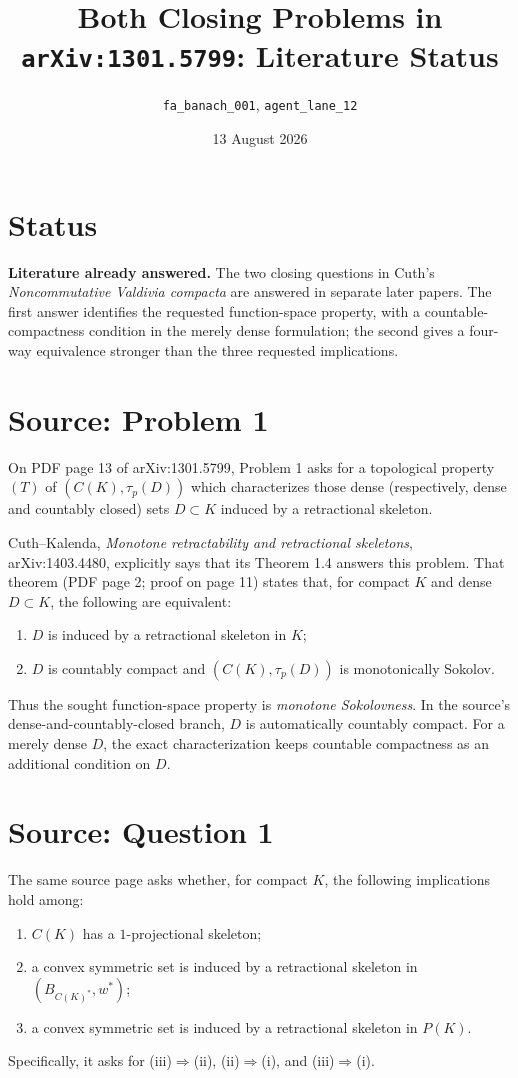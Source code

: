 \documentclass[11pt]{article}
\title{Both Closing Problems in \texttt{arXiv:1301.5799}: Literature Status}
\author{\texttt{fa\_banach\_001}, \texttt{agent\_lane\_12}}
\date{13 August 2026}
\begin{document}
\maketitle

\section*{Status}

\textbf{Literature already answered.}
The two closing questions in Cuth's \emph{Noncommutative Valdivia compacta}
are answered in separate later papers.  The first answer identifies the
requested function-space property, with a countable-compactness condition in
the merely dense formulation; the second gives a four-way equivalence
stronger than the three requested implications.

\section*{Source: Problem 1}

On PDF page 13 of arXiv:1301.5799, Problem 1 asks for a topological property
$(T)$ of $(C(K),\tau_p(D))$ which characterizes those dense (respectively,
dense and countably closed) sets $D\subset K$ induced by a retractional
skeleton.

Cuth--Kalenda, \emph{Monotone retractability and retractional skeletons},
arXiv:1403.4480, explicitly says that its Theorem 1.4 answers this problem.
That theorem (PDF page 2; proof on page 11) states that, for compact $K$ and
dense $D\subset K$, the following are equivalent:
\begin{enumerate}[label=(\roman*)]
  \item $D$ is induced by a retractional skeleton in $K$;
  \item $D$ is countably compact and $(C(K),\tau_p(D))$ is monotonically
        Sokolov.
\end{enumerate}
Thus the sought function-space property is \emph{monotone Sokolovness}.  In
the source's dense-and-countably-closed branch, $D$ is automatically
countably compact.  For a merely dense $D$, the exact characterization keeps
countable compactness as an additional condition on $D$.

\newpage
\section*{Source: Question 1}

The same source page asks whether, for compact $K$, the following implications
hold among:
\begin{enumerate}[label=(\roman*)]
  \item $C(K)$ has a $1$-projectional skeleton;
  \item a convex symmetric set is induced by a retractional skeleton in
        $(B_{C(K)^*},w^*)$;
  \item a convex symmetric set is induced by a retractional skeleton in
        $P(K)$.
\end{enumerate}
Specifically, it asks for (iii)$\Rightarrow$(ii), (ii)$\Rightarrow$(i), and
(iii)$\Rightarrow$(i).
\end{document}
